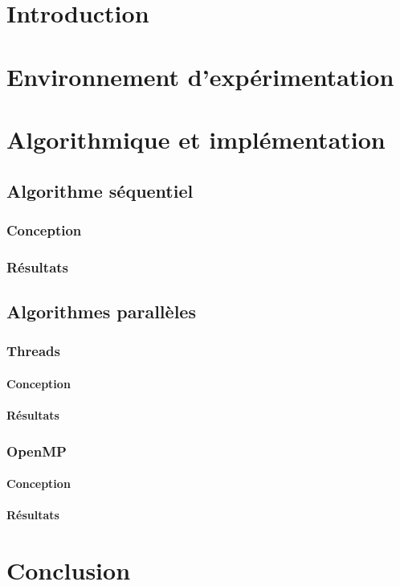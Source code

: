 \documentclass[12pt]{article}
\begin{document}
\section{Introduction}

\section{Environnement d'expérimentation}

\section{Algorithmique et implémentation}
	\subsection{Algorithme séquentiel}
		\subsubsection{Conception}
		\subsubsection{Résultats}

	\subsection{Algorithmes parallèles}
		\subsubsection{Threads}
			\paragraph{Conception}
			\paragraph{Résultats}
		\subsubsection{OpenMP}
			\paragraph{Conception}
			\paragraph{Résultats}

\section{Conclusion}
\end{document}
